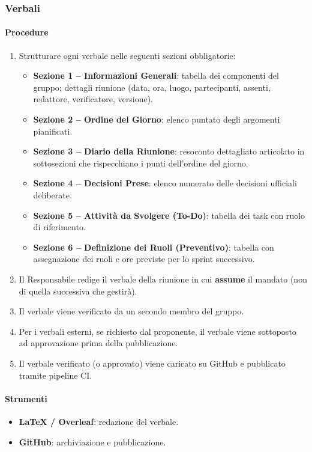 \documentclass[a4paper, 11pt, oneside]{scrartcl}
\begin{document}
\subsubsection{Verbali}
\label{sec:verbali}

\paragraph{Procedure}
\begin{enumerate}
    \item Strutturare ogni verbale nelle seguenti sezioni obbligatorie:
          \begin{itemize}
              \item \textbf{Sezione 1 – Informazioni Generali}: tabella dei componenti del gruppo; dettagli riunione (data, ora, luogo, partecipanti, assenti, redattore, verificatore, versione).
              \item \textbf{Sezione 2 – Ordine del Giorno}: elenco puntato degli argomenti pianificati.
              \item \textbf{Sezione 3 – Diario della Riunione}: resoconto dettagliato articolato in sottosezioni che rispecchiano i punti dell'ordine del giorno.
              \item \textbf{Sezione 4 – Decisioni Prese}: elenco numerato delle decisioni ufficiali deliberate.
              \item \textbf{Sezione 5 – Attività da Svolgere (To-Do)}: tabella dei task con ruolo di riferimento.
              \item \textbf{Sezione 6 – Definizione dei Ruoli (Preventivo)}: tabella con assegnazione dei ruoli e ore previste per lo sprint successivo.
          \end{itemize}
    \item Il Responsabile redige il verbale della riunione in cui \textbf{assume} il mandato (non di quella successiva che gestirà).
    \item Il verbale viene verificato da un secondo membro del gruppo.
    \item Per i verbali esterni, se richiesto dal proponente, il verbale viene sottoposto ad approvazione prima della pubblicazione.
    \item Il verbale verificato (o approvato) viene caricato su GitHub e pubblicato tramite pipeline CI.
\end{enumerate}

\paragraph{Strumenti}
\begin{itemize}
    \item \textbf{\LaTeX{} / Overleaf}: redazione del verbale.
    \item \textbf{GitHub}: archiviazione e pubblicazione.
\end{itemize}
\end{document}

